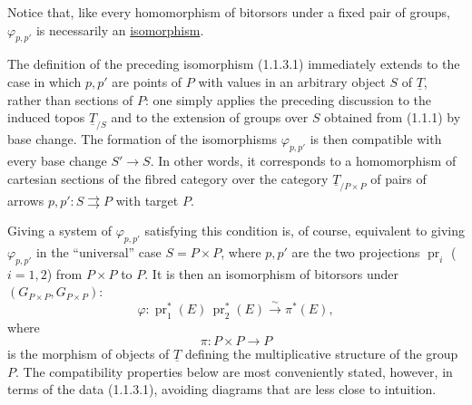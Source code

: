 
Notice that, like every homomorphism of bitorsors under a fixed pair of
groups, $\varphi_{p,p'}$ is necessarily an \underline{isomorphism}.

The definition of the preceding isomorphism (1.1.3.1) immediately extends
to the case in which $p,p'$ are points of $P$ with values in an arbitrary
object $S$ of $\underline T$, rather than sections of $P$: one simply
applies the preceding discussion to the induced topos
$\underline T_{/S}$ and to the extension of groups over $S$ obtained from
(1.1.1) by base change. The formation of the isomorphisms
$\varphi_{p,p'}$ is then compatible with every base change
$S'\longrightarrow S$. In other words, it corresponds to a homomorphism
of cartesian sections of the fibred category over the category
$\underline T_{/P\times P}$ of pairs of arrows
$p,p':S\rightrightarrows P$ with target $P$.

Giving a system of $\varphi_{p,p'}$ satisfying this condition is, of
course, equivalent to giving $\varphi_{p,p'}$ in the ``universal'' case
$S=P\times P$, where $p,p'$ are the two projections
$\operatorname{pr}_i$ ($i=1,2$) from $P\times P$ to $P$. It is then an
isomorphism of bitorsors under
$(G_{P\times P},G_{P\times P})$:
\begin{equation}\tag{1.1.3.2}
 \varphi:\operatorname{pr}_1^*(E)\,\operatorname{pr}_2^*(E)
 \overset{\sim}{\longrightarrow}\pi^*(E),
\end{equation}
where
\[
 \pi:P\times P\longrightarrow P
\]
is the morphism of objects of $\underline T$ defining the multiplicative
structure of the group $P$. The compatibility properties below are most
conveniently stated, however, in terms of the data (1.1.3.1), avoiding
diagrams that are less close to intuition.


